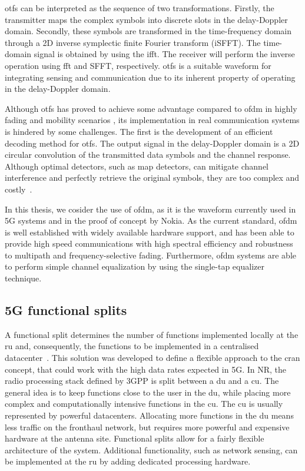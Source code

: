 	\gls{otfs} can be interpreted as the sequence of two transformations. 
	Firstly, the transmitter maps the complex symbols into discrete slots in the delay-Doppler domain.
	Secondly, these symbols are transformed in the time-frequency domain through a 2D inverse symplectic finite Fourier transform (iSFFT). The time-domain signal is obtained by using the \gls{ifft}. 
	The receiver will perform the inverse operation using \gls{fft} and SFFT, respectively.
	\gls{otfs} is a suitable waveform for integrating sensing and communication due to its inherent property of operating in the delay-Doppler domain.
	
	Although \gls{otfs} has proved to achieve some advantage compared to \gls{ofdm} in highly fading and mobility scenarios \cite{OTFS_Hadani_2017}, its implementation in real communication systems is hindered by some challenges. 
	The first is the development of an efficient decoding method for \gls{otfs}.
	The output signal in the delay-Doppler domain is a 2D circular convolution of the transmitted data symbols and the channel response. Although optimal detectors, such as \gls{map} detectors, can mitigate channel interference and perfectly retrieve the original symbols, they are too complex and costly~\cite{Raviteja_Viterbo_OTFS_decoding}.
	
	In this thesis, we cosider the use of \gls{ofdm}, as it is the waveform currently used in 5G systems and in the proof of concept by Nokia. 
	As the current standard, \gls{ofdm} is well established with widely available hardware support, and has been able to provide high speed communications with high spectral efficiency and robustness to multipath and frequency-selective fading.
	Furthermore, \gls{ofdm} systems are able to perform simple channel equalization by using the single-tap equalizer technique.
	
	 
	
	\subsection{5G functional splits}
	
	A functional split determines the number of functions implemented locally at the \gls{ru} and, consequently, the functions to be implemented in a centralised datacenter~\cite{Larsen_Checko_Christiansen_2019}. 
 	This solution was developed to define a flexible approach to the \gls{cran} concept, that could work with the high data rates expected in 5G. 
	In \gls{NR}, the radio processing stack defined by \gls{3GPP} is split between a \gls{du} and a \gls{cu}. 
	The general idea is to keep functions close to the user in the \gls{du}, while placing more complex and computationally intensive functions in the \gls{cu}. The \gls{cu} is usually represented by powerful datacenters.
	Allocating more functions in the \gls{du} means less traffic on the fronthaul network, but requires more powerful and expensive hardware at the antenna site.
	Functional splits allow for a fairly flexible architecture of the system. Additional functionality, such as network sensing, can be implemented at the \gls{ru} by adding dedicated processing hardware.

